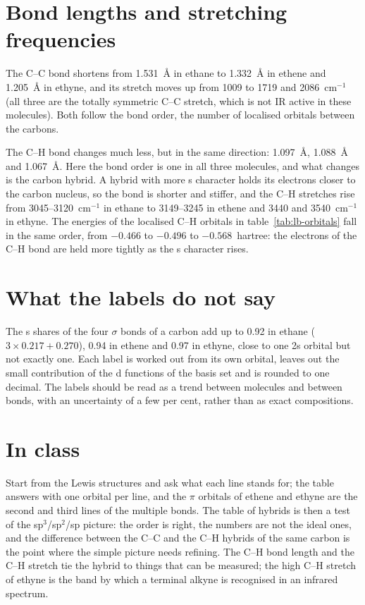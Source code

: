 \section{Bond lengths and stretching frequencies}
The C--C bond shortens from \SI{1.531}{\angstrom} in ethane to \SI{1.332}{\angstrom} in ethene and \SI{1.205}{\angstrom} in ethyne, and its stretch moves up from 1009 to 1719 and 2086~cm$^{-1}$ (all three are the totally symmetric C--C stretch, which is not IR active in these molecules). Both follow the bond order, the number of localised orbitals between the carbons.

The C--H bond changes much less, but in the same direction: \SI{1.097}{\angstrom}, \SI{1.088}{\angstrom} and \SI{1.067}{\angstrom}. Here the bond order is one in all three molecules, and what changes is the carbon hybrid. A hybrid with more s character holds its electrons closer to the carbon nucleus, so the bond is shorter and stiffer, and the C--H stretches rise from 3045--3120~cm$^{-1}$ in ethane to 3149--3245 in ethene and 3440 and 3540~cm$^{-1}$ in ethyne. The energies of the localised C--H orbitals in table~\ref{tab:lb-orbitals} fall in the same order, from $-0.466$ to $-0.496$ to $-0.568$~hartree: the electrons of the C--H bond are held more tightly as the s character rises.

\section{What the labels do not say}
The s shares of the four $\sigma$ bonds of a carbon add up to 0.92 in ethane ($3 \times 0.217 + 0.270$), 0.94 in ethene and 0.97 in ethyne, close to one 2s orbital but not exactly one. Each label is worked out from its own orbital, leaves out the small contribution of the d functions of the basis set and is rounded to one decimal. The labels should be read as a trend between molecules and between bonds, with an uncertainty of a few per cent, rather than as exact compositions.

\section{In class}
Start from the Lewis structures and ask what each line stands for; the  table answers with one orbital per line, and the $\pi$ orbitals of ethene and ethyne are the second and third lines of the multiple bonds. The table of hybrids is then a test of the sp$^3$/sp$^2$/sp picture: the order is right, the numbers are not the ideal ones, and the difference between the C--C and the C--H hybrids of the same carbon is the point where the simple picture needs refining. The C--H bond length and the C--H stretch tie the hybrid to things that can be measured; the high C--H stretch of ethyne is the band by which a terminal alkyne is recognised in an infrared spectrum.

